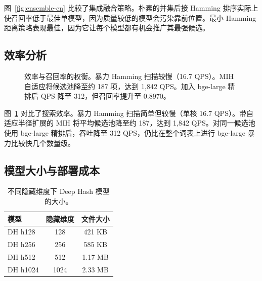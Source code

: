 \documentclass[11pt,a4paper]{article}
\begin{document}
图~\ref{fig:ensemble-cn} 比较了集成融合策略。朴素的并集后接 Hamming 排序实际上使召回率低于最佳单模型，因为质量较低的模型会污染靠前位置。最小 Hamming 距离策略表现最佳，因为它让每个模型都有机会推广其最强候选。

\subsection{效率分析}

\begin{figure}[htbp]
\centering
{}
\caption{效率与召回率的权衡。暴力 Hamming 扫描较慢（16.7 QPS）。MIH 自适应将候选池降至约 187 项，达到 1,842 QPS。加入 bge-large 精排后 QPS 降至 312，但召回率提升至 0.8970。}
\label{fig:efficiency-cn}
\end{figure}

图~\ref{fig:efficiency-cn} 对比了搜索效率。暴力 Hamming 扫描简单但较慢（单核 16.7 QPS）。带自适应半径扩展的 MIH 将平均候选池降至约 187，达到 1,842 QPS。对同一候选池使用 bge-large 精排后，吞吐降至 312 QPS，仍比在整个词表上进行 bge-large 暴力比较快几个数量级。

\subsection{模型大小与部署成本}

\begin{table}[htbp]
\centering
\caption{不同隐藏维度下 Deep Hash 模型的大小。}
\label{tab:model-size-cn}
\begin{tabular}{lcc}
\toprule
\textbf{模型} & \textbf{隐藏维度} & \textbf{文件大小} \\
\midrule
DH h128 & 128 & 421 KB \\
DH h256 & 256 & 585 KB \\
DH h512 & 512 & 1.17 MB \\
DH h1024 & 1024 & 2.33 MB \\
\bottomrule
\end{tabular}
\end{table}
\end{document}
